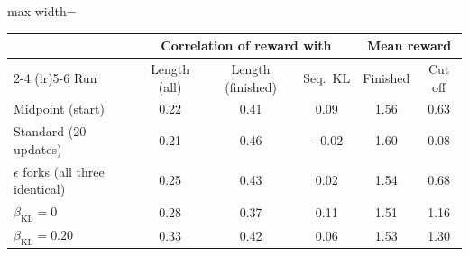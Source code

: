 \begin{adjustbox}{max width=\linewidth}
\begin{tabular}{lccccc}
\toprule
 & \multicolumn{3}{c}{Correlation of reward with} & \multicolumn{2}{c}{Mean reward} \\
\cmidrule(lr){2-4} \cmidrule(lr){5-6}
Run & Length (all) & Length (finished) & Seq.\ KL & Finished & Cut off \\
\midrule
Midpoint (start) & 0.22 & 0.41 & 0.09 & 1.56 & 0.63 \\
Standard (20 updates) & 0.21 & 0.46 & $-0.02$ & 1.60 & 0.08 \\
$\epsilon$ forks (all three identical) & 0.25 & 0.43 & 0.02 & 1.54 & 0.68 \\
$\beta_{\mathrm{KL}} = 0$ & 0.28 & 0.37 & 0.11 & 1.51 & 1.16 \\
$\beta_{\mathrm{KL}} = 0.20$ & 0.33 & 0.42 & 0.06 & 1.53 & 1.30 \\
\bottomrule
\end{tabular}
\end{adjustbox}
